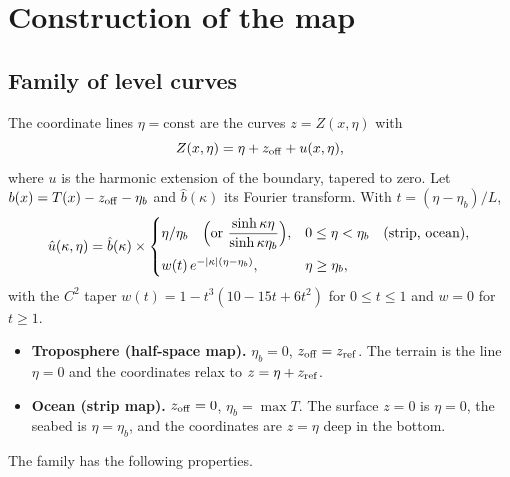 \documentclass[11pt,a4paper]{article}
\theoremstyle{remark}
\newcommand{\etab}{\eta_{b}}
\begin{document}
\section{Construction of the map}\label{sec:map}

\subsection{Family of level curves}

The coordinate lines $\eta=\mathrm{const}$ are the curves $z=Z(x,\eta)$ with
\begin{equation}\label{eq:family}
Z(x,\eta)=\eta+z_{\rm off}+u(x,\eta),
\end{equation}
where $u$ is the harmonic extension of the boundary, tapered to zero. Let
$b(x)=T(x)-z_{\rm off}-\etab$ and $\hat b(\kappa)$ its Fourier transform. With
$t=(\eta-\etab)/L$,
\begin{equation}\label{eq:kernel}
\hat u(\kappa,\eta)=\hat b(\kappa)\times
\begin{cases}
\eta/\etab\quad\Bigl(\text{or }\dfrac{\sinh\kappa\eta}{\sinh\kappa\etab}\Bigr), & 0\le\eta<\etab\quad\text{(strip, ocean)},\\[2ex]
w(t)\,e^{-|\kappa|(\eta-\etab)}, & \eta\ge\etab,
\end{cases}
\end{equation}
with the $C^2$ taper $w(t)=1-t^3(10-15t+6t^2)$ for $0\le t\le1$ and $w=0$ for
$t\ge1$.
\begin{itemize}
\item \textbf{Troposphere (half-space map).} $\etab=0$, $z_{\rm off}=z_{\rm ref}$.
The terrain is the line $\eta=0$ and the coordinates relax to $z=\eta+z_{\rm ref}$.
\item \textbf{Ocean (strip map).} $z_{\rm off}=0$, $\etab=\max T$. The surface
$z=0$ is $\eta=0$, the seabed is $\eta=\etab$, and the coordinates are
$z=\eta$ deep in the bottom.
\end{itemize}
The family has the following properties.
\end{document}

